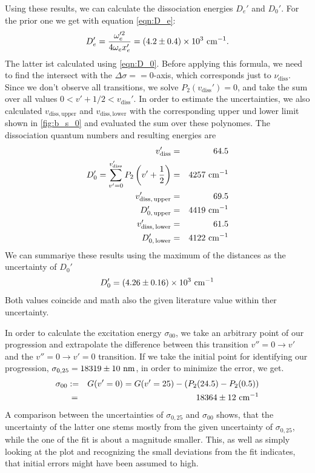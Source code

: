 Using these results, we can calculate the dissociation energies $D_e'$ and $D_0'$. For the 
prior one we get with equation \eqref{eqn:D_e}:
\begin{equation}
    D_e' = \frac{ \omega_e'^2}{ 4  \omega_e x_e'} =\left(4.2 \pm 0.4\right) \times 10^{3} \ \mathrm{cm^{-1}}.
\end{equation}
The latter ist calculated using \ref{eqn:D_0}. Before applying this formula, we need to find 
the intersect with the $\Delta \sigma == 0$-axis, which corresponds just to 
$\nu_\mathrm{diss}$. Since we don't observe all transitions, we solve $P_2(v_\mathrm{diss}') = 0$, and 
take the sum over all values $0 < v' + 1/2 < v_\mathrm{diss}'$. In order to estimate the 
uncertainties, we also calculated $v_\mathrm{diss, upper}$ and  $v_\mathrm{diss, lower}$ with 
the corresponding upper und lower limit shown in \ref{fig:b_s_0} and evaluated the sum over 
these polynomes. The dissociation quantum numbers and resulting energies are 
\begin{eqnarray}
    v_\mathrm{diss}' &=& 64.5 \\
    D_0' = \sum_{v' = 0 }^{v'_\mathrm{diss}} P_2 \left (v' + \frac{1}{2} \right ) &=& 4257 \ \mathrm{cm^{-1}} \\
    v_\mathrm{diss,\, upper}' &=& 69.5 \\
    D_{0,\, \mathrm{upper}}' &=& 4419 \ \mathrm{cm^{-1}}\\
    v_\mathrm{diss,\, lower}' &=& 61.5 \\
    D_{0,\, \mathrm{lower}}' &=& 4122 \ \mathrm{cm^{-1}}
\end{eqnarray}
We can summariye these results using the maximum of the distances as the uncertainty of $D_0'$
\begin{equation}
    D_0' = \left(4.26 \pm 0.16\right) \times 10^{3} \ \mathrm{cm^{-1}}
\end{equation}
Both values coincide and math also the given literature value within ther uncertainty. 

In order to calculate the excitation energy $\sigma_{00}$, we take an arbitrary point of our 
progression and extrapolate the difference between this transition 
$v''= 0 \rightarrow v'$ and the $v'' = 0 \rightarrow v' = 0$ transition. If we take the initial 
point for identifying our progression, $\sigma_{0, 25} = 18319 \pm 10\ \mathrm{nm}$, in order 
to minimize the error, we get.
\begin{eqnarray}
    \sigma_{00} &:=& G(v' = 0) = G(v' = 25) - (P_2(24.5) - P_2(0.5)) \nonumber \\
                 &\, =& 18364 \pm 12 \ \mathrm{cm^{-1}}
\end{eqnarray}
A comparison between the uncertainties of $\sigma_{0, 25}$ and $\sigma_{00}$ shows, 
that the uncertainty of the latter one stems mostly from the given uncertainty 
of $\sigma_{0, 25}$, while the one of the fit is about a magnitude smaller. This, 
as well as simply looking at the plot and recognizing the small deviations from 
the fit indicates, that initial errors might have been assumed to high. 

